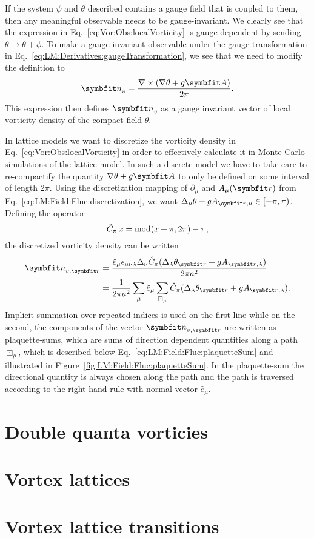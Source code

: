 If the system $\psi$ and $\theta$ described contains a gauge field that is coupled to them, then any meaningful observable needs to be gauge-invariant.
We clearly see that the expression in Eq.~\eqref{eq:Vor:Obs:localVorticity} is gauge-dependent by sending $\theta\to\theta+\phi$. To make a gauge-invariant observable under
the gauge-transformation in Eq.~\eqref{eq:LM:Derivatives:gaugeTransformation}, we see that we need to modify the definition to
\begin{equation}
    \label{eq:Vor:Obs:localVorticity}
    \v{n}_v = \frac{\nabla\times(\nabla\theta + g\v{A})}{2\pi}.
\end{equation}
This expression then defines $\v{n}_v$ as a gauge invariant vector of local vorticity density of the compact field $\theta$.

In lattice models we want to discretize the vorticity density in Eq.~\eqref{eq:Vor:Obs:localVorticity} in order to effectively calculate it in Monte-Carlo simulations
of the lattice model. In such a discrete model we have to take care to re-compactify the quantity $\nabla\theta+g\v{A}$ to only be defined on some interval of length $2\pi$.
Using the discretization mapping of $\partial_\mu$ and $A_\mu(\v{r})$ from Eq.~\eqref{eq:LM:Field:Fluc:discretization}, we want
$\Delta_\mu\theta + gA_{\v{r},\mu}\in[-\pi,\pi)$. Defining the operator
\begin{equation}
    \label{eq:Vor:Obs:moduloOperator}
    \hat{C}_\pi\, x = \operatorname{mod}(x+\pi,2\pi)-\pi,
\end{equation}
the discretized vorticity density can be written
\begin{equation}
    \label{eq:Vor:Obs:discreteLocalVorticity}
    \begin{split}
        \v{n}_{v,\v{r}} &= \frac{\hat{e}_\mu\epsilon_{\mu\nu\lambda}\Delta_\nu\hat{C}_\pi(\Delta_\lambda\theta_\v{r} + gA_{\v{r},\lambda})}{2\pi a^2}\\
        &= \frac{1}{2\pi a^2}\sum_\mu \hat{e}_\mu\sum_{\boxdot_\mu}\hat{C}_\pi(\Delta_\lambda\theta_\v{r} + gA_{\v{r},\lambda}).
    \end{split}
\end{equation}
Implicit summation over repeated indices is used on the first line while on the second, the components of the vector $\v{n}_{v,\v{r}}$ are written as plaquette-sums,
which are sums of direction dependent quantities along a path $\boxdot_\mu$, which is described below Eq.~\eqref{eq:LM:Field:Fluc:plaquetteSum} and illustrated in
Figure~\ref{fig:LM:Field:Fluc:plaquetteSum}. In the plaquette-sum the directional quantity is always chosen along the path and the path is traversed according to
the right hand rule with normal vector $\hat{e}_\mu$.

\section{Double quanta vorticies}

\section{Vortex lattices}


\section{Vortex lattice transitions}
